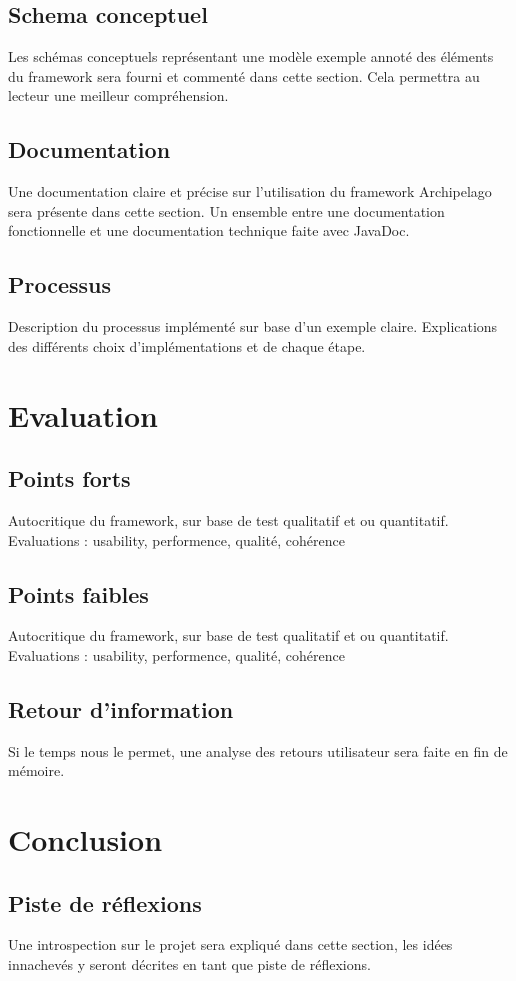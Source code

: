 \documentclass[a4paper,fleqn,12pt]{report}
\begin{document}
\section{Schema conceptuel}
Les schémas conceptuels représentant une modèle exemple annoté des éléments du framework sera fourni et commenté dans cette section. Cela permettra au lecteur une meilleur compréhension.
\section{Documentation}
Une documentation claire et précise sur l'utilisation du framework Archipelago sera présente dans cette section. Un ensemble entre une documentation fonctionnelle et une documentation technique faite avec JavaDoc.
\section{Processus}
Description du processus implémenté sur base d'un exemple claire. Explications des différents choix d'implémentations et de chaque étape.
\chapter{Evaluation}
\section{Points forts}
Autocritique du framework, sur base de test qualitatif et ou quantitatif. Evaluations : usability, performence, qualité, cohérence
\section{Points faibles}
Autocritique du framework, sur base de test qualitatif et ou quantitatif.
Evaluations : usability, performence, qualité, cohérence
\section{Retour d'information}
Si le temps nous le permet, une analyse des retours utilisateur sera faite en fin de mémoire.
\chapter{Conclusion}
\section{Piste de réflexions}
Une introspection sur le projet sera expliqué dans cette section, les idées innachevés y seront décrites en tant que piste de réflexions.
\end{document}
